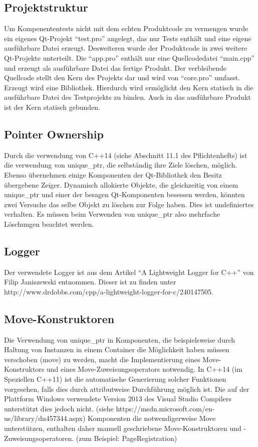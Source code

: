 \subsection{Projektstruktur}
Um Kompenententests nicht mit dem echten Produktcode zu vermengen wurde ein eigenes Qt-Projekt \enquote{test.pro}
angelegt, das nur Tests enthält und eine eigene ausführbare Datei erzeugt. Desweiteren wurde der Produktcode in zwei weitere Qt-Projekte unterteilt. Die \enquote{app.pro} enthält nur eine Quellcodedatei \enquote{main.cpp} und erzeugt als ausführbare Datei das fertige Produkt. Der verbleibende Quellcode stellt den Kern des Projekts dar und wird von \enquote{core.pro} umfasst. Erzeugt wird eine Bibliothek. Hierdurch wird ermöglicht den Kern statisch in die ausführbare Datei des Testprojekts zu binden. Auch in das ausführbare Produkt ist der Kern statisch gebunden.

\subsection{Pointer Ownership}
Durch die verwendung von C++14 (siehe Abschnitt 11.1 des Pflichtenhefts) ist die verwendung von unique\_ptr, die selbständig ihre Ziele löschen, möglich. Ebenso übernehmen einige Komponenten der Qt-Bibliothek den Besitz übergebene Zeiger. Dynamisch allokierte Objekte, die gleichzeitig von einem unique\_ptr und einer der besagen Qt-Komponenten besessen werden, könnten zwei Versuche das selbe Objekt zu löschen zur Folge haben. Dies ist undefiniertes verhalten. Es müssen beim Verwenden von unique\_ptr also mehrfache Löschungen beachtet werden.

\subsection{Logger}
Der verwendete Logger ist aus dem Artikel \enquote{A Lightweight Logger for C++} von Filip Janiszewski entnommen.
Dieser ist zu finden unter http://www.drdobbs.com/cpp/a-lightweight-logger-for-c/240147505.

\subsection{Move-Konstruktoren}
Die Verwendung von unique\_ptr in Komponenten, die beispielsweise durch Haltung von Instanzen in einem Container die Möglichkeit haben müssen verschoben (move) zu werden, macht die Implementierung eines Move-Konstruktors und eines Move-Zuweisungsoperators notwendig. In C++14 (im Speziellen C++11) ist die automatische Generierung solcher Funktionen vorgesehen, falls dies durch attributweise Durchführung möglich ist. Die auf der Plattform Windows verwendete Version 2013 des Visual Studio Compilers unterstützt dies jedoch nicht. (siehe https://msdn.microsoft.com/en-us/library/dn457344.aspx)
Komponenten die notwendigerweise Move unterstützen, enthalten daher manuell geschriebene Move-Konstruktoren und -Zuweisungsoperatoren. (zum Beispiel: PageRegistration)
